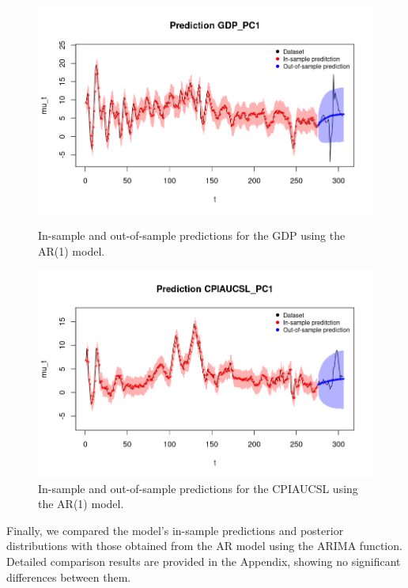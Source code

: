 \begin{figure}[H]
    \centering
    \begin{minipage}{0.49\textwidth}
        \centering
        \includegraphics[width=\textwidth]{images/2-AR/gdp_prediction.png}
        \caption{In-sample and out-of-sample predictions for the GDP using the AR(1) model.}
        \label{fig:AR1_gdp_prediction}
    \end{minipage}\hfill
    \begin{minipage}{0.49\textwidth}
        \centering
        \includegraphics[width=\textwidth]{images/2-AR/infl_prediction.png}
        \caption{In-sample and out-of-sample predictions for the CPIAUCSL using the AR(1) model.}
        \label{fig:AR1_infl_prediction}
    \end{minipage}
\end{figure}
Finally, we compared the model's in-sample predictions and posterior distributions with those obtained from the AR model using the ARIMA function. Detailed comparison results are provided in the Appendix, showing no significant differences between them.